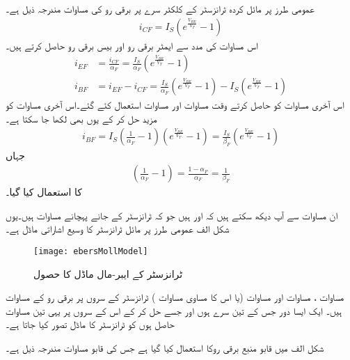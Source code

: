 عمومی طرز پر مائل کردہ  ٹرانزسٹر کے کلکٹر  سرے پر برقی رو کی مساوات مندرجہ ذیل ہے۔
\begin{align} \label{مساوات_ٹرانزسٹر_کلکٹر _سیدھی_رو}
i_{CF}=I_S \left (e^{\frac{V_{BE}}{V_T}}-1 \right )
\end{align}
اس مساوات کی مدد سے ایمٹر برقی رو   اور بیس برقی رو  حاصل کرتے ہیں۔
\begin{align}
i_{EF}&=\frac{i_{CF}}{\alpha_F}=\frac{I_S}{\alpha_F} \left (e^{\frac{V_{BE}}{V_T}}-1 \right ) 
\label{مساوات_ٹرانزسٹر_مخارج_سیدھی_رو}  \\
i_{BF}&=i_{EF}-i_{CF}=\frac{I_S}{\alpha_F} \left (e^{\frac{V_{BE}}{V_T}}-1 \right )-I_S \left (e^{\frac{V_{BE}}{V_T}}-1 \right ) \label{مساوات_ٹرانزسٹر_قابو_سیدھی_رو_الف}
\end{align}
اس آخری مساوات کو حاصل کرتے وقت مساوات   اور مساوات   استعمال کئے گئے۔اس آخری مساوات کو مزید حل کر کے یوں بھی لکھا جا سکتا ہے۔
\begin{align} \label{مساوات_ٹرانزسٹر_قابو_سیدھی_رو}
i_{BF}=I_S \left (\frac{1}{\alpha_F}-1 \right ) \left (e^{\frac{V_{BE}}{V_T}}-1 \right )=\frac{I_S}{\beta_F} \left (e^{\frac{V_{BE}}{V_T}}-1 \right )
\end{align}
جہاں
\begin{align}
\left (\frac{1}{\alpha_F}-1 \right )=\frac{1-\alpha_F}{\alpha_F}=\frac{1}{\beta_F}
\end{align}
کا استعمال کیا گیا۔

ان مساوات سے آپ دیکھ سکتے ہیں کہ اور ہیں جو کہ ٹرانزسٹر کے جانے پہچانے مساوات ہیں۔یوں شکل  الف عمومی طرز پر مائل   ٹرانزسٹر کا وسیع اشاراتی ماڈل ہے۔
\begin{figure}
\centering
\texttt{[image: ebersMollModel]}
\caption{ ٹرانزسٹر کے ایبر-مال ماڈل کا حصول}
\label{شکل_ایبر_مال_ماڈل}
\end{figure}
مساوات  ، مساوات   اور مساوات   (یا اس کا مساوی مساوات   ) ٹرانزسٹر کے سروں پر برقی رو کے مساوات ہیں۔ ایک ایسا دور جس کے تین سرے ہوں اور جسے حل کر کے اس کے سروں پر یہی تین مساوات حاصل ہوں کو ٹرانزسٹر کا ماڈل تصور کیا جاتا ہے۔

شکل  الف میں قابو منبع برقی روکا استعمال کیا گیا ہے جس کی قابو مساوات مندرجہ ذیل ہے۔

